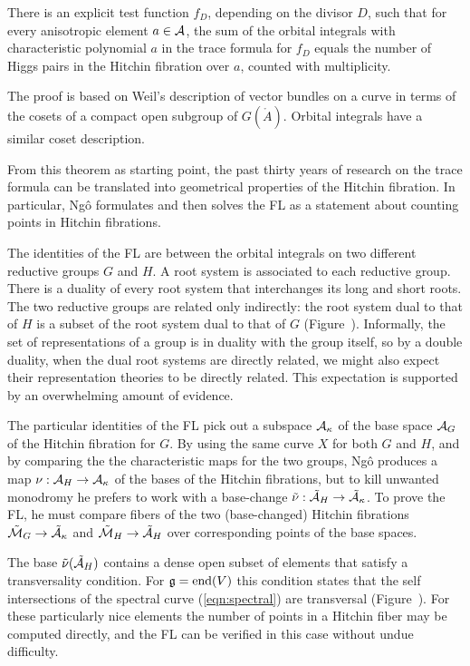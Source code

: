 \begin{thm}[Ng\^o] There is an explicit
  test function $f_D$, depending on the divisor $D$,
  such that for every anisotropic element $a\in\AA$, the
  sum of the orbital integrals with characteristic polynomial $a$  
  in the trace formula for $f_D$ 
  equals
  the number of Higgs pairs in the Hitchin fibration over $a$,
  counted with multiplicity.
\end{thm}

The proof is based on Weil's description of vector bundles on a curve
in terms of the cosets of a compact open subgroup of $G(\ring{A})$. 
Orbital integrals have a similar coset description.

From this theorem as starting point, the past thirty years of research
on the trace formula can be translated into geometrical properties of
the Hitchin fibration.  In particular, Ng\^o formulates and then solves
the FL as a statement about counting points in Hitchin
fibrations.  

The identities of the FL are between the orbital integrals on two
different reductive groups $G$ and $H$.  A root system is associated
to each reductive group.  There is a duality of every root system that
interchanges its long and short roots.  The two reductive
groups are related
only indirectly: the root system dual to that of $H$ is a subset of
the root system dual to that of $G$ (Figure~\XX).  Informally, the set
of representations of a group is in duality with the group itself, so
by a double duality, when the dual root systems are directly related,
we might also expect their representation theories to be directly
related.  This expectation is supported by an overwhelming amount
of evidence.


The particular identities of the FL pick out a subspace $\AA_\kappa$
of the base space $\AA_G$ of the Hitchin fibration for $G$.  By using
the same curve $X$ for both $G$ and $H$, and by comparing the the
characteristic maps for the two groups, Ng\^o produces a map
$\nu:\AA_H\to \AA_\kappa$ of the bases of the Hitchin fibrations, but
to kill unwanted monodromy he prefers to work with  a base-change
$\tilde\nu:\tilde\AA_H\to \tilde\AA_\kappa$.  To prove the FL, he must
compare fibers of the two (base-changed) Hitchin fibrations
$\tilde\MM_G\to\tilde\AA_\kappa$ and $\tilde\MM_H\to\tilde\AA_H$ over
corresponding points of the base spaces.

The base $\tilde\nu(\tilde\AA_H)$ contains a dense open subset of
elements that satisfy a transversality condition.  For
$\gg=\op{end}(V)$ this condition states that the self intersections of
the spectral curve (\ref{eqn:spectral}) are transversal
(Figure~\XX).  For these particularly nice elements the number of points in a
Hitchin fiber may be computed directly, and the FL can be verified
in this case without undue difficulty.

